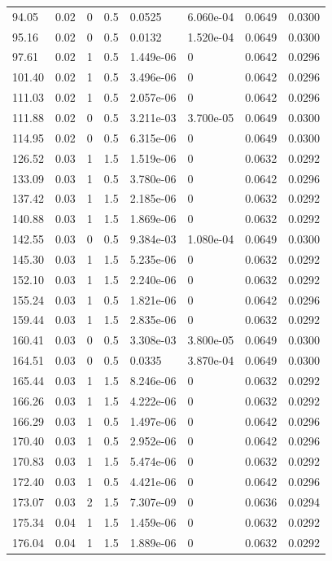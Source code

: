 \documentclass[preview]{standalone}
\begin{document}
{{\begin{tabular}{L{1.2cm}C{1.2cm} C{0.3cm}C{0.5cm} C{1.4cm}C{1.4cm} C{1.4cm}C{1.4cm}}
  94.05  &  0.02  & 0     & 0.5 &  0.0525  & 6.060e-04  & 0.0649 &  0.0300   \\ 
  95.16  &  0.02  & 0     & 0.5 &  0.0132  & 1.520e-04  & 0.0649 &  0.0300   \\ 
  97.61  &  0.02  & 1     & 0.5 &  1.449e-06  & 0  & 0.0642 &  0.0296   \\ 
  101.40  &  0.02  & 1     & 0.5 &  3.496e-06  & 0  & 0.0642 &  0.0296   \\ 
  111.03  &  0.02  & 1     & 0.5 &  2.057e-06  & 0  & 0.0642 &  0.0296   \\ 
  111.88  &  0.02  & 0     & 0.5 &  3.211e-03  & 3.700e-05  & 0.0649 &  0.0300   \\ 
  114.95  &  0.02  & 0     & 0.5 &  6.315e-06  & 0  & 0.0649 &  0.0300   \\ 
  126.52  &  0.03  & 1     & 1.5 &  1.519e-06  & 0  & 0.0632 &  0.0292   \\ 
  133.09  &  0.03  & 1     & 0.5 &  3.780e-06  & 0  & 0.0642 &  0.0296   \\ 
  137.42  &  0.03  & 1     & 1.5 &  2.185e-06  & 0  & 0.0632 &  0.0292   \\ 
  140.88  &  0.03  & 1     & 1.5 &  1.869e-06  & 0  & 0.0632 &  0.0292   \\ 
  142.55  &  0.03  & 0     & 0.5 &  9.384e-03  & 1.080e-04  & 0.0649 &  0.0300   \\ 
  145.30  &  0.03  & 1     & 1.5 &  5.235e-06  & 0  & 0.0632 &  0.0292   \\ 
  152.10  &  0.03  & 1     & 1.5 &  2.240e-06  & 0  & 0.0632 &  0.0292   \\ 
  155.24  &  0.03  & 1     & 0.5 &  1.821e-06  & 0  & 0.0642 &  0.0296   \\ 
  159.44  &  0.03  & 1     & 1.5 &  2.835e-06  & 0  & 0.0632 &  0.0292   \\ 
  160.41  &  0.03  & 0     & 0.5 &  3.308e-03  & 3.800e-05  & 0.0649 &  0.0300   \\ 
  164.51  &  0.03  & 0     & 0.5 &  0.0335  & 3.870e-04  & 0.0649 &  0.0300   \\ 
  165.44  &  0.03  & 1     & 1.5 &  8.246e-06  & 0  & 0.0632 &  0.0292   \\ 
  166.26  &  0.03  & 1     & 1.5 &  4.222e-06  & 0  & 0.0632 &  0.0292   \\ 
  166.29  &  0.03  & 1     & 0.5 &  1.497e-06  & 0  & 0.0642 &  0.0296   \\ 
  170.40  &  0.03  & 1     & 0.5 &  2.952e-06  & 0  & 0.0642 &  0.0296   \\ 
  170.83  &  0.03  & 1     & 1.5 &  5.474e-06  & 0  & 0.0632 &  0.0292   \\ 
  172.40  &  0.03  & 1     & 0.5 &  4.421e-06  & 0  & 0.0642 &  0.0296   \\ 
  173.07  &  0.03  & 2     & 1.5 &  7.307e-09  & 0  & 0.0636 &  0.0294   \\ 
  175.34  &  0.04  & 1     & 1.5 &  1.459e-06  & 0  & 0.0632 &  0.0292   \\ 
  176.04  &  0.04  & 1     & 1.5 &  1.889e-06  & 0  & 0.0632 &  0.0292   \\ 
\hline 
\end{tabular} 

}}
\end{document}
